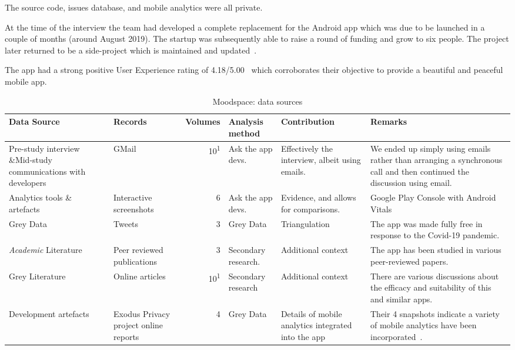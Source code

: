 The source code, issues database, and mobile analytics were all private.

At the time of the interview the team had developed a complete replacement for the Android app which was due to be launched in a couple of months (around August 2019). The startup was subsequently able to raise a round of funding and grow to six people. The project later returned to be a side-project which is maintained and updated~.

The app had a strong positive User Experience rating of 4.18/5.00~ which corroborates their objective to provide a beautiful and peaceful mobile app.


\begin{table*}
    \centering
    \footnotesize
    \tabcolsep=0.12cm
    \begin{tabular}{p{2.3cm}>{\raggedright}p{2.1cm}r>{\raggedright}p{2.4cm}>{\raggedright}p{2.8cm}>{\raggedright\arraybackslash}p{3.2cm}}
        Data Source & Records & Volumes & Analysis method & Contribution & Remarks \\
        \toprule
         Pre-study interview \&Mid-study communications with developers & GMail & 10\textsuperscript{1} & Ask the app devs. & Effectively the interview, albeit using emails.  & We ended up simply using emails rather than arranging a synchronous call and then continued the discussion using email.  \\
         Analytics tools \& artefacts &Interactive screenshots & 6 & Ask the app devs. & Evidence, and allows for comparisons. & Google Play Console with Android Vitals \\
         Grey Data &Tweets & 3 & Grey Data & Triangulation & The app was made fully free in response to the Covid-19 pandemic. \\
         \textit{Academic} Literature  &Peer reviewed publications & 3 & Secondary research. & Additional context & The app has been studied in various peer-reviewed papers.\footnotemark \\
         Grey Literature &Online articles & 10\textsuperscript{1} & Secondary research & Additional context & There are various discussions about the efficacy and suitability of this and similar apps. \\
         Development artefacts\footnotemark & Exodus Privacy project online reports & 4 & Grey Data & Details of mobile analytics integrated into the app & Their 4 snapshots indicate a variety of mobile analytics have been incorporated~\footnotemark. \\
         \bottomrule
    \end{tabular}
    \caption{Moodspace: data sources}
    \label{tab:moodspace-data-sources}
\end{table*}


